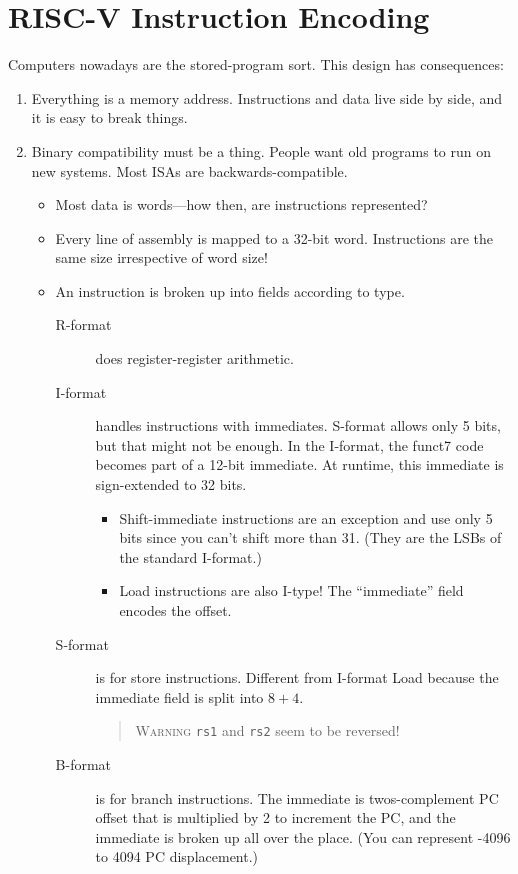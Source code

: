 \chapter{RISC-V Instruction Encoding}
Computers nowadays are the stored-program sort.
This design has consequences:
\begin{enumerate}
  \item Everything is a memory address.
    Instructions and data live side by side, and it is easy to break things.
  \item Binary compatibility must be a thing.
    People want old programs to run on new systems. Most ISAs are backwards-compatible.
    \begin{itemize}
      \item Most data is words---how then, are instructions represented?
      \item Every line of assembly is mapped to a 32-bit word.
        Instructions are the same size irrespective of word size!
      \item An instruction is broken up into fields according to type.
        \begin{description}
          \item[R-format] does register-register arithmetic.
          \item[I-format] handles instructions with immediates. S-format allows only 5 bits, but that might not be enough. In the I-format, the funct7 code becomes part of a 12-bit immediate. At runtime, this immediate is sign-extended to 32 bits.
	          \begin{itemize}
	          	\item Shift-immediate instructions are an exception and use only 5 bits since you can't shift more than 31. (They are the LSBs of the standard I-format.)
	          	\item Load instructions are also I-type! The ``immediate'' field encodes the offset.
	          \end{itemize}
          \item[S-format] is for store instructions. Different from I-format Load because the immediate field is split into \(8+4\).
          
	      \begin{quotation}
	      	\textsc{Warning} \texttt{rs1} and \texttt{rs2} seem to be reversed!
	      \end{quotation}
          \item[B-format] is for branch instructions. The immediate is twos-complement PC offset that is multiplied by 2 to increment the PC, and the immediate is broken up all over the place. (You can represent -4096 to 4094 PC displacement.)


\end{description}
\end{itemize}
\end{enumerate}
